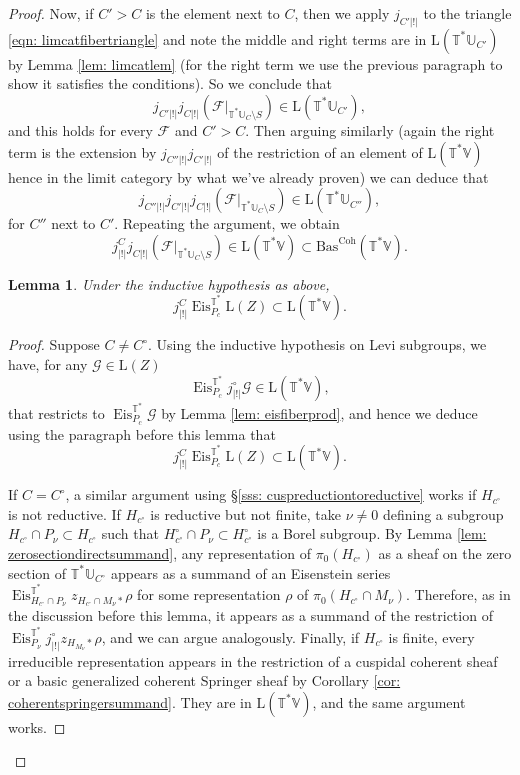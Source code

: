 \documentclass{amsart}
\newtheorem{lemma}[theorem]{Lemma}
\theoremstyle{definition}
\theoremstyle{remark}
\numberwithin{equation}{section}
\newcommand{\U}{\mathbb{U}}
\newcommand{\mc}{\mathcal}
\DeclareMathOperator{\Eis}{\mathrm{Eis}}
\newcommand{\Coh}{\mathrm{Coh}}
\newcommand{\V}{\mathbb{V}}
\newcommand{\T}{\mathbb{T}}
\newcommand{\Bas}{\mathrm{Bas}}
\newcommand{\ush}{\lvert ! \rvert}
\newcommand{\mrL}{\mathrm{L}}
\begin{document}
\begin{proof}
Now, if $C'>C$ is the element next to $C$, then we apply $j_{C'\ush}$ to the triangle \eqref{eqn: limcatfibertriangle} and note the middle and right terms are in $\mrL(\T^{\ast}\U_{C'})$ by Lemma \ref{lem: limcatlem} (for the right term we use the previous paragraph to show it satisfies the conditions). So we conclude that
\[
j_{C'\ush}j_{C\ush}(\mc F|_{\T^* \U_C\setminus S})\in \mrL(\T^{\ast}\U_{C'}), 
\]
and this holds for every $\mc F$ and $C'>C$. Then arguing similarly (again the right term is the extension by $j_{C'' \ush}j_{C' \ush}$ of the restriction of an element of $\mrL(\T^{\ast}\V)$ hence in the limit category by what we've already proven) we can deduce that
\[
j_{C''\ush}j_{C'\ush}j_{C\ush}(\mc F|_{\T^* \U_C\setminus S})\in \mrL(\T^{\ast}\U_{C''}), 
\]
for $C''$ next to $C'$. Repeating the argument, we obtain
\[
j^{C}_{\ush}j_{C\ush}(\mc F|_{\T^* \U_C\setminus S})\in \mrL(\T^*\V)\subset\Bas^\Coh(\T^*\V).  
\]
\begin{lemma}{\label{lem: extensionlimcat}}
Under the inductive hypothesis as above, 
\[
j^{C}_{\ush}\Eis_{P_c}^{\T^* }\mrL(Z) \subset \mrL(\T^*\V). 
\]
\end{lemma}

\begin{proof}
Suppose $C\neq C^\circ$. Using the inductive hypothesis on Levi subgroups, we have, for any $\mc G\in \mrL(Z)$
\[
\Eis_{P_c}^{\T^* }j^\circ_{\ush}\mc G \in \mrL(\T^*\V),
\]
that restricts to $\Eis_{P_c}^{\T^*}\mc G$ by Lemma \ref{lem: eisfiberprod}, and hence we deduce using the paragraph before this lemma that
\[
j^{C}_{\ush}\Eis_{P_c}^{\T^* }\mrL(Z) \subset \mrL(\T^*\V). 
\]

If $C=C^\circ$, a similar argument using \S \ref{sss: cuspreductiontoreductive} works if $H_{c^\circ}$ is not reductive. If $H_{c^\circ}$ is reductive but not finite, take $\nu\neq 0$ defining a subgroup $H_{c^\circ} \cap P_{\nu} \subset H_{c^{\circ}}$ such that $H_{c^\circ}^\circ \cap {P_{\nu}} \subset H_{c^\circ}^\circ$ is a Borel subgroup. By Lemma \ref{lem: zerosectiondirectsummand}, any representation of $\pi_0(H_{c^\circ})$ as a sheaf on the zero section of $\T^* \U_{C^\circ}$ appears as a summand of an Eisenstein series $\Eis^{\T^{\ast}}_{H_{c^\circ} \cap P_{\nu}}z_{H_{c^\circ} \cap M_\nu *}\rho$ for some representation $\rho$ of $\pi_0(H_{c^\circ} \cap M_\nu)$. Therefore, as in the discussion before this lemma, it appears as a summand of the restriction of $\Eis^{\T^{\ast}}_{P_{\nu}} j^\circ_{\ush} z_{H_{M_\nu}*}\rho$, and we can argue analogously. 
Finally, if $H_{c^\circ}$ is finite, every irreducible representation appears in the restriction of a cuspidal coherent sheaf or a basic generalized coherent Springer sheaf by Corollary \ref{cor: coherentspringersummand}. They are in $\mrL(\T^*\V)$, and the same argument works. 
\end{proof}


\end{proof}
\end{document}
